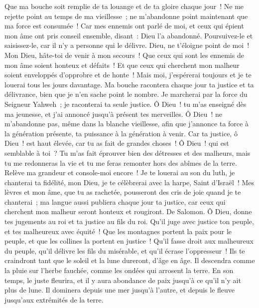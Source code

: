 \begin{multicols}{2}
Que ma bouche soit remplie de ta louange et de ta gloire chaque jour~!
Ne me rejette point au temps de ma vieillesse~; ne m'abandonne point maintenant que ma force est consumée~!
Car mes ennemis ont parlé de moi, et ceux qui épient mon âme ont pris conseil ensemble,
disant~: Dieu l'a abandonné. Poursuivez-le et saisissez-le, car il n'y a personne qui le délivre.
Dieu, ne t'éloigne point de moi~! Mon Dieu, hâte-toi de venir à mon secours~!
Que ceux qui sont les ennemis de mon âme soient honteux et défaits~! Et que ceux qui cherchent mon malheur soient enveloppés d'opprobre et de honte~!
Mais moi, j'espérerai toujours et je te louerai tous les jours davantage.
Ma bouche racontera chaque jour ta justice et ta délivrance, bien que je n'en sache point le nombre.
Je marcherai par la force du Seigneur Yahweh~; je raconterai ta seule justice.
Ô Dieu~! tu m'as enseigné dès ma jeunesse, et j'ai annoncé jusqu'à présent tes merveilles.
Ô Dieu~! ne m'abandonne pas, même dans la blanche vieillesse, afin que j'annonce ta force à la génération présente, ta puissance à la génération à venir.
Car ta justice, ô Dieu~! est haut élevée, car tu as fait de grandes choses~! Ô Dieu~! qui est semblable à toi~?
Tu m'as fait éprouver bien des détresses et des malheurs, mais tu me redonneras la vie et tu me feras remonter hors des abîmes de la terre.
Relève ma grandeur et console-moi encore~!
Je te louerai au son du luth, je chanterai ta fidélité, mon Dieu, je te célèbrerai avec la harpe, Saint d'Israël~!
Mes lèvres et mon âme, que tu as rachetée, pousseront des cris de joie quand je te chanterai~;
ma langue aussi publiera chaque jour ta justice, car ceux qui cherchent mon malheur seront honteux et rougiront.
\VerseOne{}De Salomon. Ô Dieu, donne tes jugements au roi et ta justice au fils du roi.
Qu'il juge avec justice ton peuple, et tes malheureux avec équité~!
Que les montagnes portent la paix pour le peuple, et que les collines la portent en justice~!
Qu'il fasse droit aux malheureux du peuple, qu'il délivre les fils du misérable, et qu'il écrase l'oppresseur~!
Ils te craindront tant que le soleil et la lune dureront, d'âge en âge.
Il descendra comme la pluie sur l'herbe fauchée, comme les ondées qui arrosent la terre.
En son temps, le juste fleurira, et il y aura abondance de paix jusqu'à ce qu'il n'y ait plus de lune.
Il dominera depuis une mer jusqu'à l'autre, et depuis le fleuve jusqu'aux extrémités de la terre.

\end{multicols}

